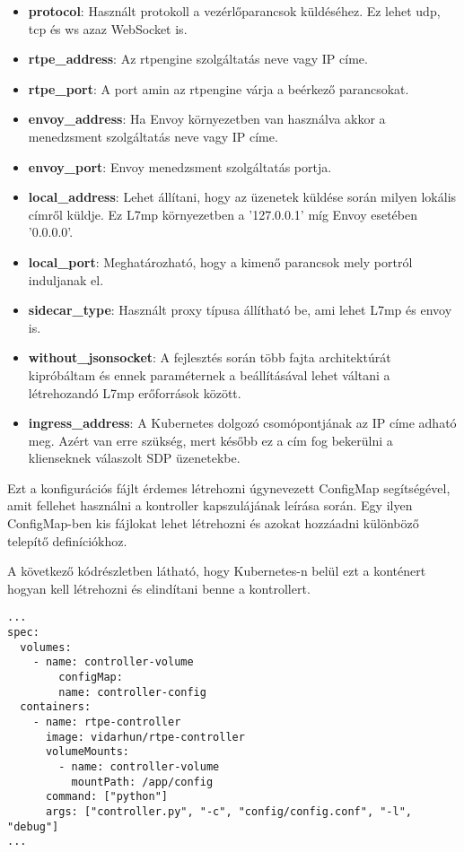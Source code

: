 \begin{itemize}
	\item \textbf{protocol}: Használt protokoll a vezérlőparancsok küldéséhez. Ez lehet
	udp, tcp és ws azaz WebSocket is.
	\item \textbf{rtpe\_address}: Az rtpengine szolgáltatás neve vagy IP címe. 
	\item \textbf{rtpe\_port}: A port amin az rtpengine várja a beérkező parancsokat. 
	\item \textbf{envoy\_address}: Ha Envoy környezetben van használva akkor a menedzsment
	szolgáltatás neve vagy IP címe. 
	\item \textbf{envoy\_port}: Envoy menedzsment szolgáltatás portja. 
	\item \textbf{local\_address}: Lehet állítani, hogy az üzenetek küldése során milyen
	lokális címről küldje. Ez L7mp környezetben a '127.0.0.1' míg Envoy esetében '0.0.0.0'.
	\item \textbf{local\_port}: Meghatározható, hogy a kimenő parancsok mely portról
	induljanak el. 
	\item \textbf{sidecar\_type}: Használt proxy típusa állítható be, ami lehet L7mp és envoy is.
	\item \textbf{without\_jsonsocket}: A fejlesztés során több fajta architektúrát kipróbáltam
	és ennek paraméternek a beállításával lehet váltani a létrehozandó L7mp erőforrások között. 
	\item \textbf{ingress\_address}: A Kubernetes dolgozó csomópontjának az IP címe adható meg.
	Azért van erre szükség, mert később ez a cím fog bekerülni a klienseknek válaszolt SDP
	üzenetekbe. 
\end{itemize}

Ezt a konfigurációs fájlt érdemes létrehozni úgynevezett ConfigMap segítségével, amit fellehet
használni a kontroller kapszulájának leírása során. Egy ilyen ConfigMap-ben kis fájlokat 
lehet létrehozni és azokat hozzáadni különböző telepítő definíciókhoz. 

A következő kódrészletben látható, hogy Kubernetes-n belül ezt a konténert hogyan kell 
létrehozni és elindítani benne a kontrollert. 

\begin{lstlisting}[caption=Kubernetes konténer specifikációja, label=lst:kubeSpec]
...
spec:
  volumes:
    - name: controller-volume
        configMap:
        name: controller-config
  containers:
    - name: rtpe-controller
      image: vidarhun/rtpe-controller
      volumeMounts:
        - name: controller-volume
          mountPath: /app/config
      command: ["python"]
      args: ["controller.py", "-c", "config/config.conf", "-l", "debug"]
...
\end{lstlisting}

